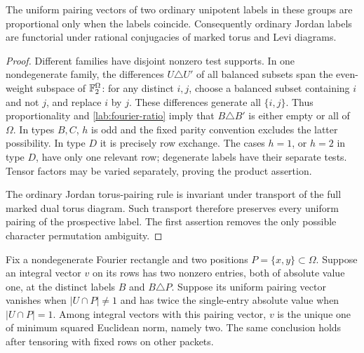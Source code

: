 \begin{lemma}\label{lab:fingerprints}
The uniform pairing vectors of two ordinary unipotent labels in
these groups are proportional only when the labels coincide.
Consequently ordinary Jordan labels are functorial under rational
conjugacies of marked torus and Levi diagrams.
\end{lemma}

\begin{proof}
Different families have disjoint nonzero test supports.  In one
nondegenerate family, the differences $U\triangle U'$ of all
balanced subsets span the even-weight subspace of $\mathbb F_2^\Omega$:
for any distinct $i,j$, choose a balanced subset containing $i$
and not $j$, and replace $i$ by $j$.  These differences generate
all $\{i,j\}$.  Thus proportionality and
\eqref{lab:fourier-ratio} imply that
$B\triangle B'$ is either empty or all of $\Omega$.
In types $B,C$, $h$ is odd and the fixed parity convention excludes
the latter possibility.  In type $D$ it is precisely row exchange.
The cases $h=1$, or $h=2$ in type $D$, have only one relevant row;
degenerate labels have their separate tests.  Tensor factors may be
varied separately, proving the product assertion.

The ordinary Jordan torus-pairing rule is invariant under transport
of the full marked dual torus diagram.  Such transport therefore
preserves every uniform pairing of the prospective label.  The
first assertion removes the only possible character permutation
ambiguity.
\end{proof}

\begin{lemma}\label{lab:slice}
Fix a nondegenerate Fourier rectangle and two positions
$P=\{x,y\}\subset\Omega$.  Suppose an integral vector $v$ on its
rows has two nonzero entries, both of absolute value one, at the
distinct labels $B$ and $B\triangle P$.  Suppose its uniform
pairing vector vanishes when $|U\cap P|\ne1$ and has twice the
single-entry absolute value when $|U\cap P|=1$.
Among integral vectors with this pairing vector, $v$ is the unique
one of minimum squared Euclidean norm, namely two.
The same conclusion holds after tensoring with fixed rows on
other packets.
\end{lemma}


